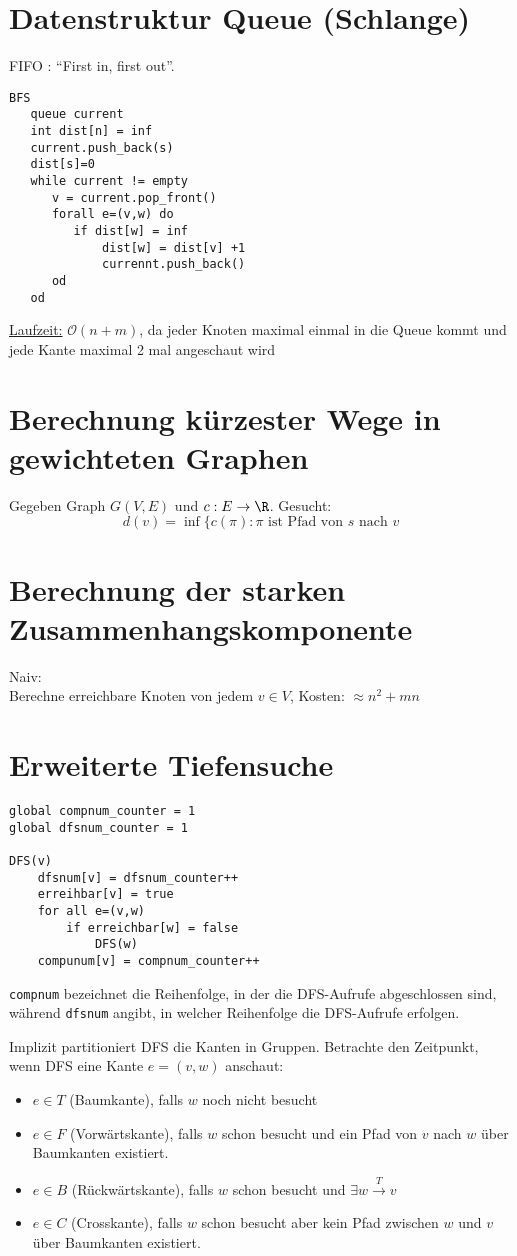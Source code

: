 \documentclass[11pt]{scrbook}
\begin{document}
\section{Datenstruktur Queue (Schlange)}
FIFO : “First in, first out”.

\begin{verbatim}
BFS
   queue current
   int dist[n] = inf
   current.push_back(s)
   dist[s]=0
   while current != empty
      v = current.pop_front()
      forall e=(v,w) do
         if dist[w] = inf
             dist[w] = dist[v] +1
             currennt.push_back()
      od
   od
\end{verbatim}

\underline{Laufzeit:}
$\mathcal O(n+m)$, da jeder Knoten maximal einmal in die Queue kommt und jede Kante maximal 2 mal angeschaut wird

\section{Berechnung kürzester Wege in gewichteten Graphen}
Gegeben Graph $G(V,E)$ und $c:E\to \R$.
Gesucht:\\
\[
d(v)=\inf\{c(\pi):\pi \text{ ist Pfad von $s$ nach $v$}
\]

\section{Berechnung der starken Zusammenhangskomponente}
Naiv:\\
Berechne erreichbare Knoten von jedem $v\in V$, Kosten: $\approx n^2+mn$

\section{Erweiterte Tiefensuche}

\begin{verbatim}
global compnum_counter = 1
global dfsnum_counter = 1

DFS(v)
    dfsnum[v] = dfsnum_counter++
    erreihbar[v] = true
    for all e=(v,w)
        if erreichbar[w] = false
            DFS(w)
    compunum[v] = compnum_counter++
\end{verbatim}

\verb|compnum| bezeichnet die Reihenfolge, in der die DFS-Aufrufe abgeschlossen sind, während \verb|dfsnum| angibt, in welcher Reihenfolge die DFS-Aufrufe erfolgen.

Implizit partitioniert DFS die Kanten in Gruppen.
Betrachte den Zeitpunkt, wenn DFS eine Kante $e=(v,w)$ anschaut:
\begin{itemize}
\item $e\in T$ (Baumkante), falls $w$ noch nicht besucht
\item $e\in F$ (Vorwärtskante), falls $w$ schon besucht und ein Pfad von $v$ nach $w$ über Baumkanten existiert.
\item $e\in B$ (Rückwärtskante), falls $w$ schon besucht und $\exists w\stackrel{T}\to v$
\item $e\in C$ (Crosskante), falls $w$ schon besucht aber kein Pfad zwischen $w$ und $v$ über Baumkanten existiert.
\end{itemize}
\end{document}
